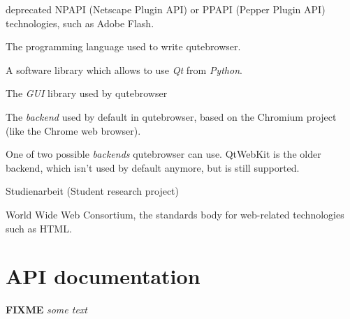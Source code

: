 \documentclass[a4paper,parskip=full,DIV=14,BCOR=15mm]{scrreprt}
\newcommand{\fixme}[1]{\textbf{FIXME} \emph{#1}}
\begin{document}
\begin{appendices}
\begin{multicols}{2}
\begin{description}[leftmargin=0pt]
{      deprecated NPAPI (Netscape Plugin API) or PPAPI (Pepper Plugin API)
      technologies, such as Adobe Flash.}
  \item[Python]{The programming language used to write qutebrowser.}
  \item[PyQt]{A software library which allows to use \emph{Qt} from \emph{Python}.}
  \item[Qt]{The \emph{GUI} library used by qutebrowser}
  \item[QtWebEngine]{The \emph{backend} used by default in qutebrowser, based on
      the Chromium project (like the Chrome web browser).}
  \item[QtWebKit]{One of two possible \emph{backends} qutebrowser can use.
      QtWebKit is the older backend, which isn't used by default anymore, but is
      still supported.}
  \item[SA]{Studienarbeit (Student research project)}
  \item[W3C]{World Wide Web Consortium, the standards body for web-related
      technologies such as HTML.}
\end{description}
\end{multicols}

\chapter{API documentation}
\label{ch:sphinx}
\fixme{some text}


\renewcommand{\bibname}{\chapter{Literature and Sources}}
\printbibliography
\end{appendices}
\end{document}
